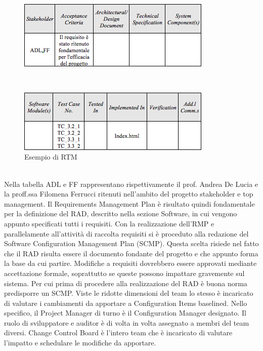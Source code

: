 \\
\begin{figure}[h]
\centering
\includegraphics[scale=.7]{img/3.png}

\label{fig:cd}
\end{figure}
\\
\begin{figure}[h]
\centering
\includegraphics[scale=.7]{img/4.png}
\caption{Esempio di RTM}
\label{fig:cd}
\end{figure}
\\
Nella tabella ADL e FF rappresentano rispettivamente il prof. Andrea De Lucia e la proff.ssa Filomena Ferrucci ritenuti nell\rq ambito del progetto stakeholder e top management.
Il Requirements Management Plan \`{e} risultato quindi fondamentale per la definizione del RAD, descritto nella sezione Software, in cui vengono appunto specificati tutti i requisiti.
Con la realizzazione dell\rq RMP e parallelamente all\rq attivit\`{a} di raccolta requisiti si \`{e} proceduto alla redazione del Software Configuration Management Plan (SCMP). Questa scelta risiede nel fatto che il RAD risulta essere il documento fondante del progetto e che appunto forma la base da cui partire. Modifiche a requisiti dovrebbero essere approvati mediante accettazione formale, soprattutto se queste possono impattare gravemente sul sistema.
Per cui prima di procedere alla realizzazione del RAD \`{e} buona norma predisporre un SCMP. 
Viste le ridotte dimensioni del team lo stesso \`{e} incaricato di valutare i cambiamenti da apportare a Configuration Items baselined.
Nello specifico, il Project Manager di turno \`{e} il Configuration Manager designato. Il ruolo di sviluppatore e auditor \`{e} di volta in volta assegnato a membri del team diversi.
Change Control Board \`{e} l\rq intero team che \`{e} incaricato di valutare l\rq impatto e schedulare le modifiche da apportare.
